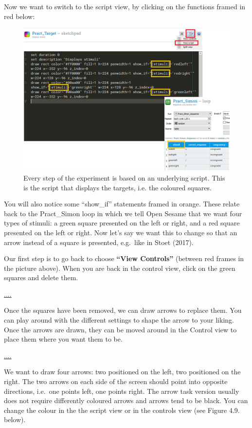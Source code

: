 \documentclass[
]{book}
\begin{document}
Now we want to switch to the script view, by clicking on the functions framed in red below:

\begin{figure}

{\centering \includegraphics[width=0.99\linewidth]{images/changesimon/02Script} 

}

\caption{Every step of the experiment is based on an underlying script. This is the script that displays the targets, i.e. the coloured squares.}\label{fig:Figure3-6}
\end{figure}

You will also notice some ``show\_if'' statements framed in orange. These relate back to the Pract\_Simon loop in which we tell Open Sesame that we want four types of stimuli: a green square presented on the left or right, and a red square presented on the left or right. Now let's say we want this to change so that an arrow instead of a square is presented, e.g.~like in Stoet (2017).

Our first step is to go back to choose \textbf{``View Controls''} (between red frames in the picture above). When you are back in the control view, click on the green squares and delete them.

\url{....}

Once the squares have been removed, we can draw arrows to replace them. You can play around with the different settings to shape the arrow to your liking. Once the arrows are drawn, they can be moved around in the Control view to place them where you want them to be.

\url{....}

We want to draw four arrows: two positioned on the left, two positioned on the right. The two arrows on each side of the screen should point into opposite directions, i.e.~one points left, one points right. The arrow task version usually does not require differently coloured arrows and arrows tend to be black. You can change the colour in the the script view or in the controls view (see Figure 4.9. below).
\end{document}
